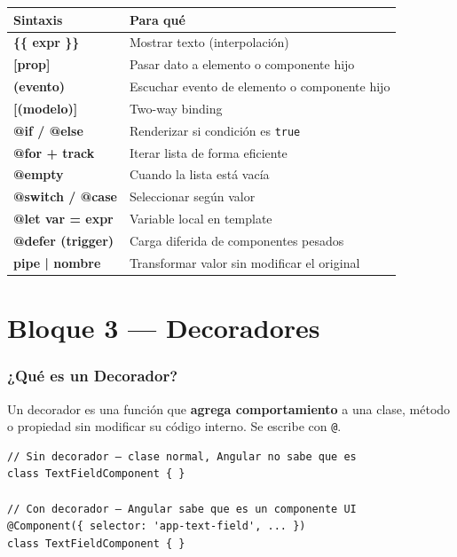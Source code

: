 \documentclass[12pt, a4paper]{article}
\begin{document}
\begin{center}
\renewcommand{\arraystretch}{1.6}
\begin{tabular}{>{\ttfamily\bfseries}p{4.5cm} p{8cm}}
\toprule
Sintaxis & Para qué \\
\midrule
\{\{ expr \}\} & Mostrar texto (interpolación) \\
{[}prop{]} & Pasar dato a elemento o componente hijo \\
(evento) & Escuchar evento de elemento o componente hijo \\
{[}(modelo){]} & Two-way binding \\
@if / @else & Renderizar si condición es \texttt{true} \\
@for + track & Iterar lista de forma eficiente \\
@empty & Cuando la lista está vacía \\
@switch / @case & Seleccionar según valor \\
@let var = expr & Variable local en template \\
@defer (trigger) & Carga diferida de componentes pesados \\
pipe | nombre & Transformar valor sin modificar el original \\
\bottomrule
\end{tabular}
\end{center}

\newpage
\part{ Bloque 3 --- Decoradores}

\section{  ¿Qué es un Decorador?}

Un decorador es una función que \textbf{agrega comportamiento} a una clase,
método o propiedad sin modificar su código interno. Se escribe con \texttt{@}.

\begin{lstlisting}
// Sin decorador — clase normal, Angular no sabe que es
class TextFieldComponent { }

// Con decorador — Angular sabe que es un componente UI
@Component({ selector: 'app-text-field', ... })
class TextFieldComponent { }
\end{lstlisting}
\end{document}

